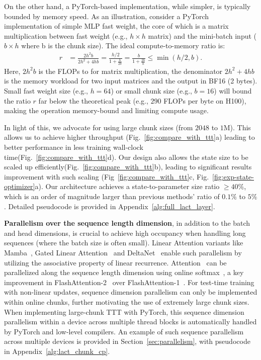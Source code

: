 On the other hand, a PyTorch-based implementation, while simpler, is typically bounded by memory speed. As an illustration, consider a PyTorch implementation of simple MLP fast weight, the core of which is a matrix multiplication between fast weight (e.g., $h \times h$ matrix) and the mini-batch input ($b \times h$ where b is the chunk size).
The ideal compute-to-memory ratio is:
\begin{align} \label{eq:comp_to_mem_ratio}
r&= \frac{2 h^2 b}{2h^2+ 4 hb}=\frac{h / 2}{1 + \frac{h}{2b}} = \frac{b} {1  + \frac{2b}{h}} \le \min(h / 2, b).
\end{align}
Here, $2 h^2 b$ is the FLOPs to for matrix multiplication, the denominator $2h^2+ 4 hb$ is the memory workload for two input matrices and the output in BF16 (2 bytes).
Small fast weight size (e.g., $h=64$) or small chunk size (e.g., $b=16$) will bound the ratio $r$ far below the theoretical peak (e.g., $290$ FLOPs per byte on H100), making the operation memory-bound and limiting compute usage.

In light of this, we advocate for using large chunk sizes (from $2048$ to $1$M).
This allows us to achieve higher throughput (Fig.~\ref{fig:compare_with_ttt}a) leading to better performance in less training wall-clock time(Fig.~\ref{fig:compare_with_ttt}d).
Our design also allows the state size to be  
scaled up efficiently(Fig.~\ref{fig:compare_with_ttt}b), leading to significant results improvement with such scaling 
(Fig~\ref{fig:compare_with_ttt}c, Fig.~\ref{fig:exp-state-optimizer}a).
Our architecture achieves a state-to-parameter size ratio $\ge\!40\%$, which is an order of magnitude 
larger than previous methods' ratio of $0.1\%$ to $5\%$. Detailed pseudocode is provided in Appendix~\ref{alg:full_lact_layer}.


\textbf{Parallelism over the sequence length dimension}, in addition to the batch and head dimensions, is crucial to achieve high occupancy when handling long sequences (where the batch size is often small). Linear Attention variants like Mamba~\cite{gu2023mamba}, Gated Linear Attention~\cite{yang2024gated} and DeltaNet~\cite{yangparallelizing} enable such parallelism by utilizing the associative property of linear recurrence. Attention~\cite{vaswani2017attention,dao2023flashattention} can be parallelized along the sequence length dimension using online softmax~\cite{milakov2018online}, a key improvement in FlashAttention-2~\cite{dao2023flashattention} over FlashAttention-1~\cite{dao2022flashattention}. For test-time training with non-linear updates, sequence dimension parallelism can only be implemented within online chunks, further motivating the use of extremely large chunk sizes. When implementing large-chunk TTT with PyTorch, this sequence dimension parallelism within a device across multiple thread blocks is automatically handled by PyTorch and low-level compilers. An example of such sequence parallelism across multiple devices is provided in Section~\ref{sec:parallelism}, with pseudocode in Appendix~\ref{alg:lact_chunk_cp}.







